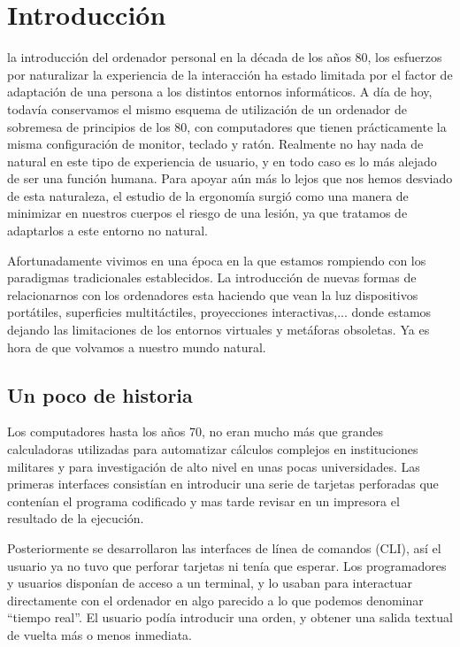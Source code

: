 \chapter{Introducción}
 la introducción del ordenador personal en la década de los años 80, los esfuerzos por naturalizar la experiencia de la interacción ha estado limitada por el factor de adaptación de una persona a los distintos entornos informáticos. A día de hoy, todavía conservamos el mismo esquema de utilización de un ordenador de sobremesa de principios de los 80, con computadores que tienen prácticamente la misma configuración de monitor, teclado y ratón. Realmente no hay nada de natural en este tipo de experiencia de usuario, y en todo caso es lo más alejado de ser una función humana. Para apoyar aún más lo lejos que nos hemos desviado de esta naturaleza, el estudio de la ergonomía surgió como una manera de minimizar en nuestros cuerpos el riesgo de una lesión, ya que tratamos de adaptarlos a este entorno no natural.

Afortunadamente vivimos en una época en la que estamos rompiendo con los paradigmas tradicionales establecidos. La introducción de nuevas formas de relacionarnos con los ordenadores esta haciendo que vean la luz dispositivos portátiles, superficies multitáctiles, proyecciones interactivas,... donde estamos dejando las limitaciones de los entornos virtuales y metáforas obsoletas. Ya es hora de que volvamos a nuestro mundo natural.

\section{Un poco de historia}
Los computadores hasta los años 70, no eran mucho más que grandes calculadoras utilizadas para automatizar cálculos complejos en instituciones militares y para investigación de alto nivel en unas pocas universidades. Las primeras interfaces consistían en introducir una serie de tarjetas perforadas que contenían el programa codificado y mas tarde revisar en un impresora el resultado de la ejecución.

Posteriormente se desarrollaron las interfaces de línea de comandos (CLI), así el usuario ya no tuvo que perforar tarjetas ni tenía que esperar. Los programadores y usuarios disponían de acceso a un terminal, y lo usaban para interactuar directamente con el ordenador en algo parecido a lo que podemos denominar ``tiempo real''. El usuario podía introducir una orden, y obtener una salida textual de vuelta más o menos inmediata.


